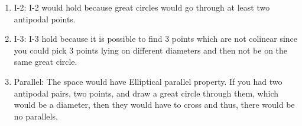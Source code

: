 \documentclass[10pt,a4paper]{article}
\begin{document}
\begin{enumerate}
\begin{enumerate}
\item I-2: I-2 would hold because great circles would go through at least two antipodal points.
\item I-3: I-3 hold because it is possible to find 3 points which are not colinear since you could pick 3 points lying on different diameters and then not be on the same great circle.
\item Parallel: The space would have Elliptical parallel property. If you had two antipodal pairs, two points, and draw a great circle through them, which would be a diameter, then they would have to cross and thus, there would be no parallels. 
\end{enumerate}
\end{enumerate}
\end{document}
